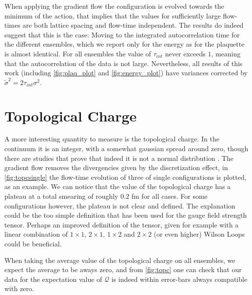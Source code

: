 When applying the gradient flow the configuration is evolved towards the minimum of the action, that implies that the values for sufficiently large flow-times are both lattice spacing and flow-time independent. The results do indeed suggest that this is the case:
Moving to the integrated autocorrelation time for the different ensembles, which we report only for the energy as for the plaquette is almost identical. For all ensembles the value of $\tau_{int}$ never exceeds $1$, meaning that the autocorrelation of the data is not large. Nevertheless, all results of this work (including \cref{fig:plaq_plot} and \cref{fig:energy_plot}) have variances corrected by $\tilde\sigma^2 = 2\tau_{int}\sigma^2$. 

\section{Topological Charge}
A more interesting quantity to measure is the topological charge. In the continuum it is an integer, with a somewhat gaussian spread around zero, though there are studies that prove that indeed it is not a normal distribution \CIT. The gradient flow removes the divergencies given by the discretization effect, in \cref{fig:topcsingle} the flow-time evolution of three of single configurations is plotted, as an example. We can notice that the value of the topological charge has a plateau at a total smearing of roughly  $0.2$ fm for all cases. 
For some configurations however, the plateau is not clear and defined. The explanation could be the too simple definition that has been used for the gauge field strength tensor. Perhaps an improved definition of the tensor, given for example with a linear combination of $1\times 1$, $2\times 1$, $1\times 2$ and $2\times 2$ (or even higher) Wilson Loops could be beneficial.

When taking the average value of the topological charge on all ensembles, we expect the average to be aways zero, and from \cref{fig:topc} one can check that our data for the expectation value of $\mathcal{Q}$ is indeed within error-bars always compatible with zero. 

